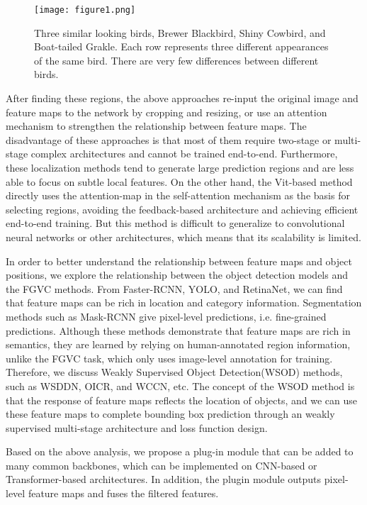 \documentclass[conference]{IEEEtran}
\begin{document}
\begin{figure}
\centerline{\texttt{[image: figure1.png]}}
\caption{Three similar looking birds, Brewer Blackbird, Shiny Cowbird, and Boat-tailed Grakle. Each row represents three different appearances of the same bird. There are very few differences between different birds.}
\label{fig1}
\end{figure}

After finding these regions, the above approaches re-input the original image and feature maps to the network by cropping and resizing, or use an attention mechanism to strengthen the relationship between feature maps. The disadvantage of these approaches is that most of them require two-stage or multi-stage complex architectures and cannot be trained end-to-end. Furthermore, these localization methods tend to generate large prediction regions and are less able to focus on subtle local features. On the other hand, the Vit-based method directly uses the attention-map in the self-attention mechanism as the basis for selecting regions, avoiding the feedback-based architecture and achieving efficient end-to-end training. But this method is difficult to generalize to convolutional neural networks or other architectures, which means that its scalability is limited. 

In order to better understand the relationship between feature maps and object positions, we explore the relationship between the object detection models and the FGVC methods. From Faster-RCNN\cite{Faster_RCNN}, YOLO\cite{YOLO}\cite{YOLO_v4}, and RetinaNet\cite{RetinaNet}, we can find that feature maps can be rich in location and category information. Segmentation methods such as Mask-RCNN\cite{Mask_RCNN} give pixel-level predictions, i.e. fine-grained predictions. Although these methods demonstrate that feature maps are rich in semantics, they are learned by relying on human-annotated region information, unlike the FGVC task, which only uses image-level annotation  for training. Therefore, we discuss Weakly Supervised Object Detection(WSOD) methods, such as WSDDN\cite{WSDDN}, OICR\cite{OICR}, and WCCN\cite{WCCN}, etc. The concept of the WSOD method is that the response of feature maps reflects the location of objects, and we can use these feature maps to complete bounding box prediction through an weakly supervised multi-stage architecture and loss function design.

Based on the above analysis, we propose a plug-in module that can be added to many common backbones, which can be implemented on CNN-based or Transformer-based architectures. In addition, the plugin module outputs pixel-level feature maps and fuses the filtered features.
\end{document}
